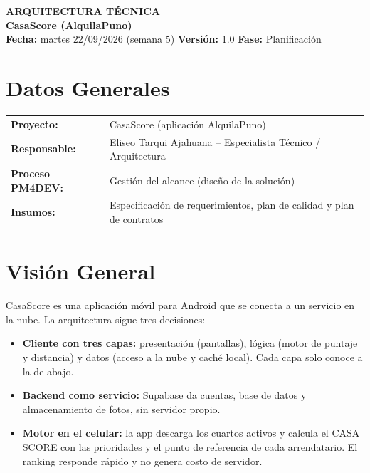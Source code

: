 \documentclass[11pt,a4paper]{article}
\begin{document}
\begin{center}
    {\Large \textbf{\textcolor{AzulUNA}{ARQUITECTURA TÉCNICA}}}\\[3pt]
    {\normalsize \textbf{CasaScore (AlquilaPuno)}}\\[4pt]
    \footnotesize \textbf{Fecha:} martes 22/09/2026 (semana 5) \quad \textbar\quad \textbf{Versión:} 1.0 \quad \textbar\quad \textbf{Fase:} Planificación
\end{center}

\vspace{0.1cm}

\section{Datos Generales}
\noindent\begin{tabularx}{\textwidth}{@{}P{4.2cm} L@{}}
\toprule
\textbf{Proyecto:} & CasaScore (aplicación AlquilaPuno) \\
\textbf{Responsable:} & Eliseo Tarqui Ajahuana -- Especialista Técnico / Arquitectura \\
\textbf{Proceso PM4DEV:} & Gestión del alcance (diseño de la solución) \\
\textbf{Insumos:} & Especificación de requerimientos, plan de calidad y plan de contratos \\
\bottomrule
\end{tabularx}

\section{Visión General}
CasaScore es una aplicación móvil para Android que se conecta a un servicio en la nube. La arquitectura sigue tres decisiones:
\begin{itemize}[leftmargin=*]
    \item \textbf{Cliente con tres capas:} presentación (pantallas), lógica (motor de puntaje y distancia) y datos (acceso a la nube y caché local). Cada capa solo conoce a la de abajo.
    \item \textbf{Backend como servicio:} Supabase da cuentas, base de datos y almacenamiento de fotos, sin servidor propio.
    \item \textbf{Motor en el celular:} la app descarga los cuartos activos y calcula el CASA SCORE con las prioridades y el punto de referencia de cada arrendatario. El ranking responde rápido y no genera costo de servidor.
\end{itemize}
\end{document}
